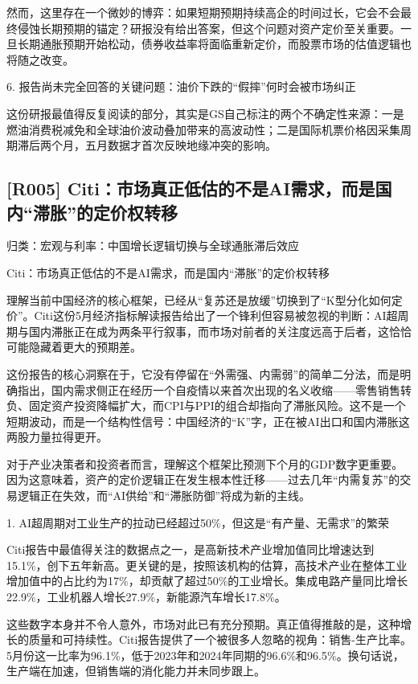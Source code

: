 \documentclass[11pt]{ctexart}
\begin{document}
然而，这里存在一个微妙的博弈：如果短期预期持续高企的时间过长，它会不会最终侵蚀长期预期的锚定？研报没有给出答案，但这个问题对资产定价至关重要。一旦长期通胀预期开始松动，债券收益率将面临重新定价，而股票市场的估值逻辑也将随之改变。

6. 报告尚未完全回答的关键问题：油价下跌的“假摔”何时会被市场纠正

这份研报最值得反复阅读的部分，其实是GS自己标注的两个不确定性来源：一是燃油消费税减免和全球油价波动叠加带来的高波动性；二是国际机票价格因采集周期滞后两个月，五月数据才首次反映地缘冲突的影响。

\subsection{[R005] Citi：市场真正低估的不是AI需求，而是国内“滞胀”的定价权转移}
{\small\color{refgray}归类：宏观与利率：中国增长逻辑切换与全球通胀滞后效应}

Citi：市场真正低估的不是AI需求，而是国内“滞胀”的定价权转移

理解当前中国经济的核心框架，已经从“复苏还是放缓”切换到了“K型分化如何定价”。Citi这份5月经济指标解读报告给出了一个锋利但容易被忽视的判断：AI超周期与国内滞胀正在成为两条平行叙事，而市场对前者的关注度远高于后者，这恰恰可能隐藏着更大的预期差。

这份报告的核心洞察在于，它没有停留在“外需强、内需弱”的简单二分法，而是明确指出，国内需求侧正在经历一个自疫情以来首次出现的名义收缩——零售销售转负、固定资产投资降幅扩大，而CPI与PPI的组合却指向了滞胀风险。这不是一个短期波动，而是一个结构性信号：中国经济的“K”字，正在被AI出口和国内滞胀这两股力量拉得更开。

对于产业决策者和投资者而言，理解这个框架比预测下个月的GDP数字更重要。因为这意味着，资产的定价逻辑正在发生根本性迁移——过去几年“内需复苏”的交易逻辑正在失效，而“AI供给”和“滞胀防御”将成为新的主线。

1. AI超周期对工业生产的拉动已经超过50\%，但这是“有产量、无需求”的繁荣

Citi报告中最值得关注的数据点之一，是高新技术产业增加值同比增速达到15.1\%，创下五年新高。更关键的是，按照该机构的估算，高技术产业在整体工业增加值中的占比约为17\%，却贡献了超过50\%的工业增长。集成电路产量同比增长22.9\%，工业机器人增长27.9\%，新能源汽车增长17.8\%。

这些数字本身并不令人意外，市场对此已有充分预期。真正值得推敲的是，这种增长的质量和可持续性。Citi报告提供了一个被很多人忽略的视角：销售-生产比率。5月份这一比率为96.1\%，低于2023年和2024年同期的96.6\%和96.5\%。换句话说，生产端在加速，但销售端的消化能力并未同步跟上。
\end{document}

